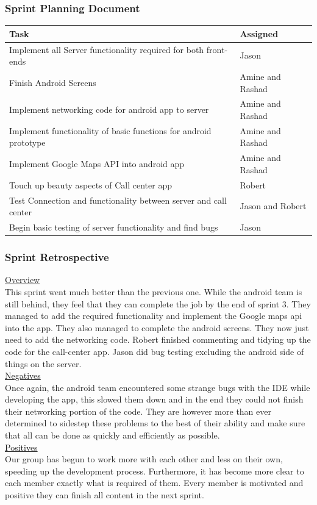 \documentclass[a4paper,12pt]{article}
\begin{document}
\subsubsection{Sprint Planning Document}
\begin{tabular}{|p{9.5cm}|p{3.5cm}|}
\hline
Task & Assigned \\ \hline
Implement all Server functionality required for both front-ends & Jason \\ \hline
Finish Android Screens & Amine and Rashad \\ \hline
Implement networking code for android app to server & Amine and Rashad \\ \hline
Implement functionality of basic functions for android prototype & Amine and Rashad \\ \hline
Implement Google Maps API into android app & Amine and Rashad \\ \hline
Touch up beauty aspects of Call center app & Robert \\ \hline
Test Connection and functionality between server and call center & Jason and Robert \\ \hline
Begin basic testing of server functionality and find bugs & Jason \\ \hline

\end{tabular}

\subsubsection{Sprint Retrospective}
\underline{Overview}\\
This sprint went much better than the previous one. While the android team is still behind, they feel that they can complete the job by the end of sprint 3. They managed to add the required functionality and implement the Google maps api into the app. They also managed to complete the android screens. They now just need to add the networking code. Robert finished commenting and tidying up the code for the call-center app. Jason did bug testing excluding the android side of things on the server. \\
\underline{Negatives}\\
Once again, the android team encountered some strange bugs with the IDE while developing the app, this slowed them down and in the end they could not finish their networking portion of the code. They are however more than ever determined to sidestep these problems to the best of their ability and make sure that all can be done as quickly and efficiently as possible.\\
\underline{Positives}\\
Our group has begun to work more with each other and less on their own, speeding up the development process. Furthermore, it has become more clear to each member exactly what is required of them. Every member is motivated and positive they can finish all content in the next sprint.
\end{document}
